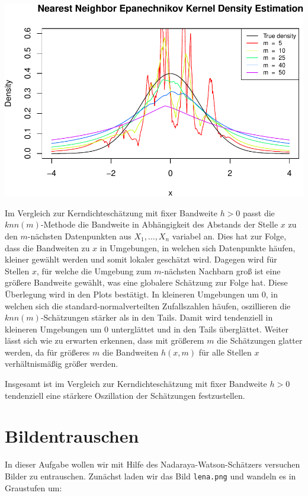 \documentclass[10pt,]{article}
\begin{document}
\includegraphics{project2_files/figure-latex/m-nearest neighbors test-3.pdf}

Im Vergleich zur Kerndichteschätzung mit fixer Bandweite \(h>0\) passt
die \(knn(m)\)-Methode die Bandweite in Abhängigkeit des Abstands der
Stelle \(x\) zu den \(m\)-nächsten Datenpunkten aus \(X_1, \ldots, X_n\)
variabel an. Dies hat zur Folge, dass die Bandweiten zu \(x\) in
Umgebungen, in welchen sich Datenpunkte häufen, kleiner gewählt werden
und somit lokaler geschätzt wird. Dagegen wird für Stellen \(x\), für
welche die Umgebung zum \(m\)-nächsten Nachbarn groß ist eine größere
Bandweite gewählt, was eine globalere Schätzung zur Folge hat. Diese
Überlegung wird in den Plots bestätigt. In kleineren Umgebungen um 0, in
welchen sich die standard-normalverteilten Zufallszahlen häufen,
oszillieren die \(knn(m)\)-Schätzungen stärker als in den Tails. Damit
wird tendenziell in kleineren Umgebungen um 0 unterglättet und in den
Tails überglättet. Weiter lässt sich wie zu erwarten erkennen, dass mit
größerem \(m\) die Schätzungen glatter werden, da für größeres \(m\) die
Bandweiten \(h(x,m)\) für alle Stellen \(x\) verhältnismäßig größer
werden.

Insgesamt ist im Vergleich zur Kerndichteschätzung mit fixer Bandweite
\(h>0\) tendenziell eine stärkere Oszillation der Schätzungen
festzustellen.

\section{Bildentrauschen}\label{bildentrauschen}

In dieser Aufgabe wollen wir mit Hilfe des Nadaraya-Watson-Schätzers
versuchen Bilder zu entrauschen. Zunächst laden wir das Bild
\texttt{lena.png} und wandeln es in Graustufen um:
\end{document}
